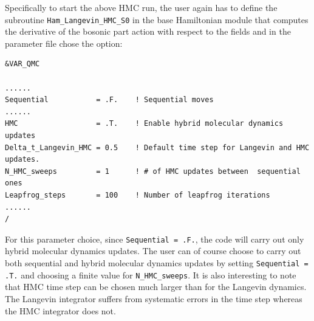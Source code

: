 Specifically  to  start the  above HMC run, the  user again has to define the subroutine \texttt{Ham\_Langevin\_HMC\_S0}  in the  base Hamiltonian  module  that  computes the derivative of the bosonic part action with respect to the fields  
and  in the parameter file chose the option: 
\begin{lstlisting}[style=fortran]
&VAR_QMC

......
Sequential           = .F.    ! Sequential moves
......
HMC                  = .T.    ! Enable hybrid molecular dynamics updates
Delta_t_Langevin_HMC = 0.5    ! Default time step for Langevin and HMC updates. 
N_HMC_sweeps         = 1      ! # of HMC updates between  sequential ones
Leapfrog_steps       = 100    ! Number of leapfrog iterations
......
/
\end{lstlisting}
For this parameter  choice,   since  \texttt{Sequential           = .F.},  the  code  will carry out  only hybrid molecular dynamics updates.   The  user can  of course  choose to carry out  both sequential and hybrid molecular dynamics updates by setting \texttt{Sequential           = .T.} and choosing a finite value for \texttt{N\_HMC\_sweeps}. It is also interesting  to note that  HMC  time step  can be chosen much  larger than for the  Langevin dynamics.  The Langevin integrator   suffers from systematic errors in  the  time step whereas the  HMC integrator does not.
